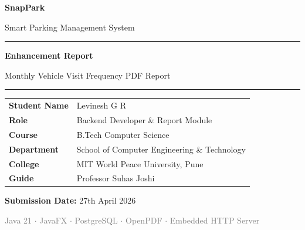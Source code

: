 \documentclass[12pt,a4paper]{article}
\begin{document}
\begin{titlepage}
    \centering
    \vspace*{2cm}
    
    {\Huge\bfseries\textcolor{snapblue}{SnapPark}\par}
    \vspace{0.3cm}
    {\Large\textcolor{snapcyan}{Smart Parking Management System}\par}
    
    \vspace{1.5cm}
    \rule{\textwidth}{1.5pt}
    \vspace{0.5cm}
    
    {\LARGE\bfseries Enhancement Report\par}
    \vspace{0.3cm}
    {\Large\textcolor{snapblue}{Monthly Vehicle Visit Frequency PDF Report}\par}
    
    \vspace{0.5cm}
    \rule{\textwidth}{1.5pt}
    
    \vspace{2cm}
    
    \begin{tabular}{ll}
        \textbf{Student Name}    & Levinesh G R \\
        \textbf{Role}            & Backend Developer \& Report Module \\
        \textbf{Course}          & B.Tech Computer Science \\
        \textbf{Department}      & School of Computer Engineering \& Technology \\
        \textbf{College}         & MIT World Peace University, Pune \\
        \textbf{Guide}           & Professor Suhas Joshi \\
    \end{tabular}
    
    \vspace{2cm}
    
    {\large\textbf{Submission Date:} 27th April 2026\par}
    
    \vfill
    {\small\textcolor{gray}{Java 21 $\cdot$ JavaFX $\cdot$ PostgreSQL $\cdot$ OpenPDF $\cdot$ Embedded HTTP Server}\par}
\end{titlepage}
\end{document}
